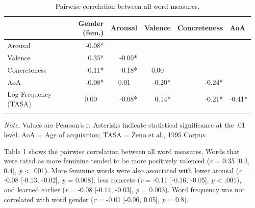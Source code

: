 \documentclass[
  english,
  ,man,floatsintext]{apa6}
\begin{document}
\begin{table}[tbp]
\begin{center}
\begin{threeparttable}
\caption{\label{tab:unnamed-chunk-16}Pairwise correlation between all word measures.}
\begin{tabular}{lrrrrl}
\toprule
 & Gender (fem.) & Arousal & Valence & Concreteness & AoA\\
\midrule
Arousal & -0.08* &  &  &  & \\
Valence & 0.35* & -0.09* &  &  & \\
Concreteness & -0.11* & -0.18* & 0.00\ \ &  & \\
AoA & -0.08* & 0.01\ \ & -0.20* & -0.24* & \\
Log Frequency (TASA) & 0.00\ \ & -0.08* & 0.14* & -0.21* & -0.41*\\
\bottomrule
\addlinespace
\end{tabular}
\begin{tablenotes}[para]
\normalsize{\textit{Note.} Values are Pearson's r. Asterisks indicate statistical significance at the .01 level. AoA = Age of acquisition; TASA = Zeno et al., 1995 Corpus.}
\end{tablenotes}
\end{threeparttable}
\end{center}
\end{table}

Table 1 shows the pairwise correlation between all word measures. Words that were rated as more feminine tended to be more positively valenced (\emph{r} = 0.35 {[}0.3, 0.4{]}, \emph{p} \textless{} .001). More feminine words were also associated with lower arousal (\emph{r} = -0.08 {[}-0.13, -0.02{]}, \emph{p} = 0.008), less concrete (\emph{r} = -0.11 {[}-0.16, -0.05{]}, \emph{p} \textless{} .001), and learned earlier (\emph{r} = -0.08 {[}-0.14, -0.03{]}, \emph{p} = 0.003). Word frequency was not correlated with word gender (\emph{r} = -0.01 {[}-0.06, 0.05{]}, \emph{p} = 0.8).
\end{document}
